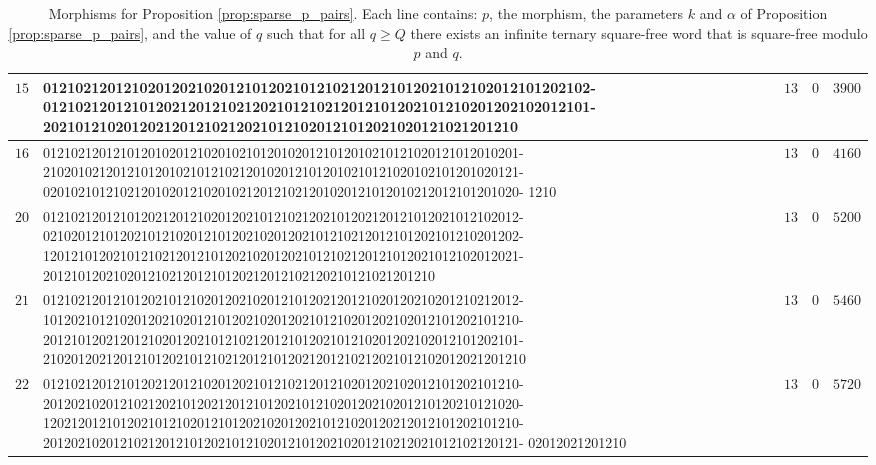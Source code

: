\documentclass[12pt]{article}
\theoremstyle{definition}
\begin{document}
\begin{table}[H]
\begin{tabular}{ |C{0.25cm}|p{12cm}|C{0.25cm}|C{0.25cm}|p{0.8cm}| }
 $15$  & 01210212012102012021020121012021012102120121012021012102012101202102-
         01210212012101202120121021202101210212012101202101210201202102012101-
         20210121020120212012102120210121020121012021020121021201210
 & $13$ & $0$ & $3900$\\
 \hline
 $16$  & 01210212012101201020121020102101201020121012010210121020121012010201-
         21020102120121012010210121021201020121012010210121020102101201020121-
         02010210121021201020121020102120121021201020121012010212012101201020-
         1210
 & $13$ & $0$ & $4160$\\
 \hline
 $20$  & 01210212012101202120121020120210121021202101202120121012021012102012-
         02102012101202101210201210120210201202101210212012101202101210201202-
         12012101202101210212012101202102012021012102120121012021012102012021-
         20121012021020121021201210120212012102120210121021201210
 & $13$ & $0$ & $5200$\\
 \hline
 $21$  & 01210212012101202101210201202102012101202120121020120210201210212012-
         10120210121020120210201210120210201202101210201202102012101202101210-
         20121012021201210201202101210212012101202101210201202102012101202101-
         210201202120121012021012102120121012021201210212021012102012021201210
 & $13$ & $0$ & $5460$\\
 \hline
 $22$  & 01210212012101202120121020120210121021201210201202102012101202101210-
         20120210201210212021012021201210120210121020120210201210120210121020-
         12021201210120210121020121012021020120210121020120212012101202101210-
         20120210201210212012101202101210201210120210201210212021012102120121-
         02012021201210
 & $13$ & $0$ & $5720$\\
 \hline
\end{tabular}
    \caption{Morphisms for Proposition \ref{prop:sparse_p_pairs}. Each line 
    contains: $p$, the morphism, the parameters $k$ and $\alpha$ of Proposition \ref{prop:sparse_p_pairs}, and the value of $q$ such that for all $q\geq Q$ there exists an infinite ternary square-free word that is square-free modulo $p$ and $q$.}
    \label{fig:morphisms_cone_remaining_cases}
\end{table}
\end{document}
